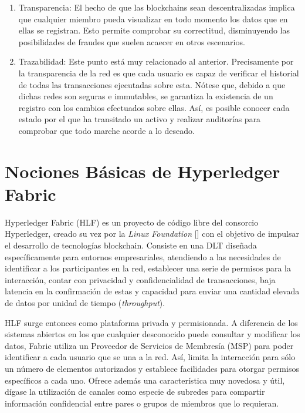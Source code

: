 \begin{enumerate}
	
	\item Transparencia: El hecho de que las blockchains sean descentralizadas implica que cualquier miembro pueda visualizar en todo momento los datos que en ellas se registran. Esto permite comprobar su correctitud, disminuyendo las posibilidades de fraudes que suelen acaecer en otros escenarios.
	
	\item Trazabilidad: Este punto est\'a muy relacionado al anterior. Precisamente por la transparencia de la red es que cada usuario es capaz de verificar el historial de todas las transacciones ejecutadas sobre esta. N\'otese que, debido a que dichas redes son seguras e immutables, se garantiza la existencia de un registro con los cambios efectuados sobre ellas. As\'i, es posible conocer cada estado por el que ha transitado un activo y realizar auditor\'ias para comprobar que todo marche acorde a lo deseado.	

\end{enumerate}


\section{Nociones B\'asicas de Hyperledger Fabric}

Hyperledger Fabric (HLF) es un proyecto de c\'odigo libre del consorcio Hyperledger, creado su vez por la \emph{Linux Foundation} [\cite{linuxfoundation}] con el objetivo de impulsar el desarrollo de tecnolog\'ias blockchain. Consiste en una DLT dise\~nada espec\'ificamente para entornos empresariales, atendiendo a las necesidades de identificar a los participantes en la red, establecer una serie de permisos para la interacci\'on, contar con privacidad y confidencialidad de transacciones, baja latencia en la confirmaci\'on de estas y capacidad para enviar una cantidad elevada de datos por unidad de tiempo (\emph{throughput}).

HLF surge entonces como plataforma privada y permisionada. A diferencia de los sistemas abiertos en los que cualquier desconocido puede consultar y modificar los datos, Fabric utiliza un Proveedor de Servicios de Membres\'ia (MSP) para poder identificar a cada usuario que se una a la red. As\'i, limita la interacci\'on para s\'olo un n\'umero de elementos autorizados y establece facilidades para otorgar permisos espec\'ificos a cada uno. Ofrece adem\'as una caracter\'istica muy novedosa y \'util, d\'igase la utilizaci\'on de canales como especie de subredes para compartir informaci\'on confidencial entre pares o grupos de miembros que lo requieran.

